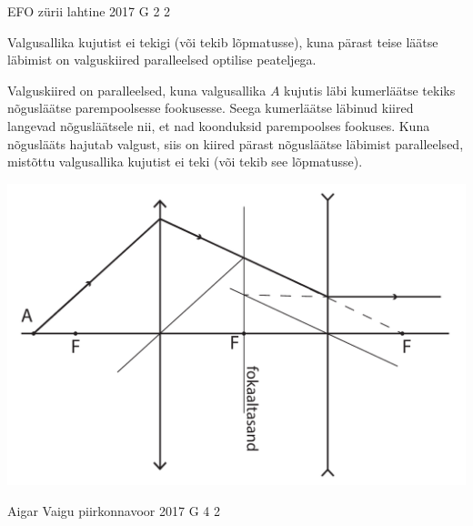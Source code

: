 \documentclass[11pt, twoside]{article}
\begin{document}
{{\fi
}

{EFO zürii} %
{lahtine} %
{2017} %
{G 2} %
{2} %
{

\ifSolution
Valgusallika kujutist ei tekigi (või tekib lõpmatusse), kuna pärast teise läätse läbimist on valguskiired paralleelsed optilise peateljega.

Valguskiired on paralleelsed, kuna  valgusallika $A$ kujutis läbi kumerläätse tekiks nõgusläätse parempoolsesse fookusesse. Seega kumerläätse läbinud kiired langevad nõgusläätsele nii, et nad koonduksid parempoolses fookuses. Kuna nõguslääts hajutab valgust, siis on kiired pärast nõgusläätse läbimist paralleelsed, mistõttu valgusallika kujutist ei teki (või tekib see lõpmatusse).

\begin{center}
	\includegraphics[width=0.7\linewidth]{2017-lahg-02-valgusallikaslah}
\end{center}
\fi
}

{Aigar Vaigu} %
{piirkonnavoor} %
{2017} %
{G 4} %
{2} %
{

}}
\end{document}
